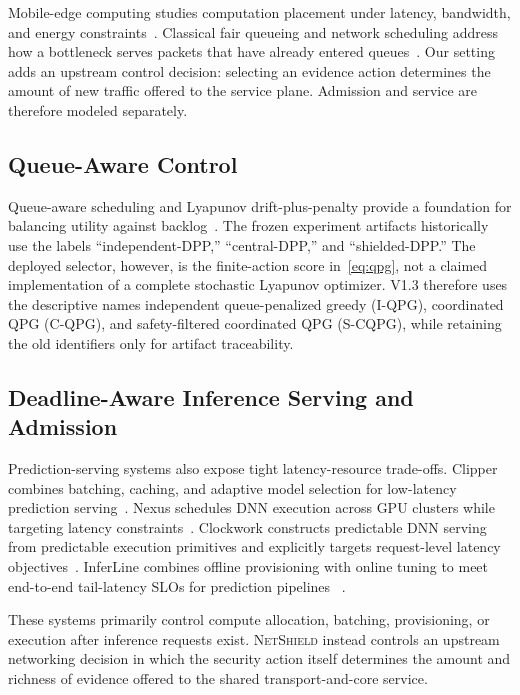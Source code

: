 \documentclass[10pt,journal]{IEEEtran}
\newcommand{\NetShield}{\textsc{NetShield}}
\newcommand{\IQPG}{\textsc{I-QPG}}
\newcommand{\CQPG}{\textsc{C-QPG}}
\newcommand{\SCQPG}{\textsc{S-CQPG}}
\begin{document}
Mobile-edge computing studies computation placement under latency,
bandwidth, and energy constraints~\cite{mao2017mec,mach2017mec}.
Classical fair queueing and network scheduling address how a bottleneck
serves packets that have already entered queues~\cite{demers1989fair,
parekh1993gps}. Our setting adds an upstream control decision: selecting
an evidence action determines the amount of new traffic offered to the
service plane. Admission and service are therefore modeled separately.

\subsection{Queue-Aware Control}

Queue-aware scheduling and Lyapunov drift-plus-penalty provide a
foundation for balancing utility against backlog~\cite{tassiulas1992,
neely2010}. The frozen experiment artifacts historically use the labels
``independent-DPP,'' ``central-DPP,'' and ``shielded-DPP.'' The deployed
selector, however, is the finite-action score in~\eqref{eq:qpg}, not a
claimed implementation of a complete stochastic Lyapunov optimizer.
V1.3 therefore uses the descriptive names independent queue-penalized
greedy (\IQPG), coordinated QPG (\CQPG), and safety-filtered coordinated
QPG (\SCQPG), while retaining the old identifiers only for artifact
traceability.

\subsection{Deadline-Aware Inference Serving and Admission}

Prediction-serving systems also expose tight latency-resource trade-offs.
Clipper combines batching, caching, and adaptive model selection for
low-latency prediction serving~\cite{crankshaw2017clipper}.
Nexus schedules DNN execution across GPU clusters while targeting
latency constraints~\cite{shen2019nexus}. Clockwork constructs predictable
DNN serving from predictable execution primitives and explicitly targets
request-level latency objectives~\cite{gujarati2020clockwork}.
InferLine combines offline provisioning with online tuning to meet
end-to-end tail-latency SLOs for prediction pipelines
~\cite{crankshaw2020inferline}.

These systems primarily control compute allocation, batching,
provisioning, or execution after inference requests exist.
\NetShield{} instead controls an upstream networking decision in which
the security action itself determines the amount and richness of evidence
offered to the shared transport-and-core service.
\end{document}
